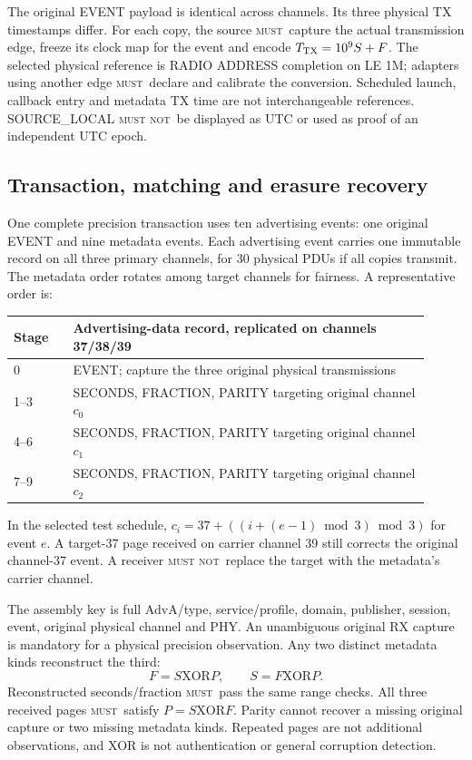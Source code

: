 \documentclass[11pt,letterpaper]{article}
\newcommand{\page}{\clearpage}
\newcommand{\must}{\textsc{must}}
\newcommand{\mustnot}{\textsc{must not}}
\begin{document}
The original EVENT payload is identical across channels. Its three physical TX timestamps differ. For each copy, the source \must\ capture the actual transmission edge, freeze its clock map for the event and encode $T_{\rm TX}=10^9S+F$. The selected physical reference is RADIO ADDRESS completion on LE 1M; adapters using another edge \must\ declare and calibrate the conversion. Scheduled launch, callback entry and metadata TX time are not interchangeable references. SOURCE\_LOCAL \mustnot\ be displayed as UTC or used as proof of an independent UTC epoch.

\page
\subsection{Transaction, matching and erasure recovery}\label{sec:assembly}
One complete precision transaction uses ten advertising events: one original EVENT and nine metadata events. Each advertising event carries one immutable record on all three primary channels, for 30 physical PDUs if all copies transmit. The metadata order rotates among target channels for fairness. A representative order is:
\begin{center}\small
\begin{tabular}{@{}L{0.13\linewidth}L{0.78\linewidth}@{}}\toprule
Stage & Advertising-data record, replicated on channels 37/38/39 \\ & EVENT; capture the three original physical transmissions \\
1--3 & SECONDS, FRACTION, PARITY targeting original channel $c_0$ \\
4--6 & SECONDS, FRACTION, PARITY targeting original channel $c_1$ \\
7--9 & SECONDS, FRACTION, PARITY targeting original channel $c_2$ \\\bottomrule
\end{tabular}
\end{center}
In the selected test schedule, $c_i=37+((i+(e-1)\bmod3)\bmod3)$ for event $e$. A target-37 page received on carrier channel 39 still corrects the original channel-37 event. A receiver \mustnot\ replace the target with the metadata's carrier channel.

The assembly key is full AdvA/type, service/profile, domain, publisher, session, event, original physical channel and PHY. An unambiguous original RX capture is mandatory for a physical precision observation. Any two distinct metadata kinds reconstruct the third:
\begin{equation}
F=S\mathbin{\mathrm{XOR}}P,\qquad S=F\mathbin{\mathrm{XOR}}P.
\end{equation}
Reconstructed seconds/fraction \must\ pass the same range checks. All three received pages \must\ satisfy $P=S\mathbin{\mathrm{XOR}}F$. Parity cannot recover a missing original capture or two missing metadata kinds. Repeated pages are not additional observations, and XOR is not authentication or general corruption detection.
\end{document}
